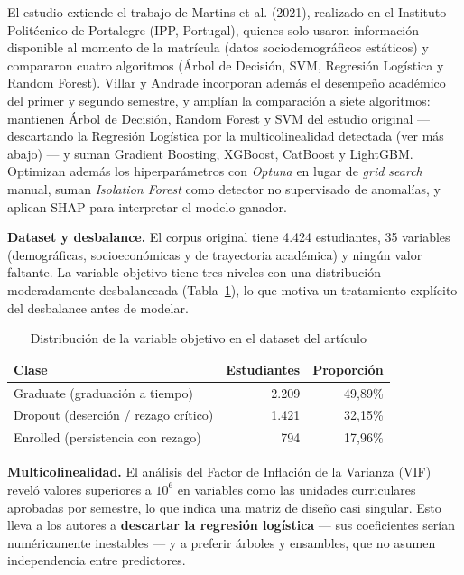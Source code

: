 \documentclass[11pt,a4paper]{article}
\begin{document}
El estudio extiende el trabajo de Martins et al. (2021), realizado en el Instituto Politécnico de Portalegre (IPP, Portugal), quienes solo usaron información disponible al momento de la matrícula (datos sociodemográficos estáticos) y compararon cuatro algoritmos (Árbol de Decisión, SVM, Regresión Logística y Random Forest). Villar y Andrade incorporan además el desempeño académico del primer y segundo semestre, y amplían la comparación a siete algoritmos: mantienen Árbol de Decisión, Random Forest y SVM del estudio original --- descartando la Regresión Logística por la multicolinealidad detectada (ver más abajo) --- y suman Gradient Boosting, XGBoost, CatBoost y LightGBM. Optimizan además los hiperparámetros con \textit{Optuna} en lugar de \textit{grid search} manual, suman \textit{Isolation Forest} como detector no supervisado de anomalías, y aplican SHAP para interpretar el modelo ganador.

\textbf{Dataset y desbalance.} El corpus original tiene 4.424 estudiantes, 35 variables (demográficas, socioeconómicas y de trayectoria académica) y ningún valor faltante. La variable objetivo tiene tres niveles con una distribución moderadamente desbalanceada (Tabla~\ref{tab:distribucion}), lo que motiva un tratamiento explícito del desbalance antes de modelar.

\begin{table}[h!]
\centering
\caption{Distribución de la variable objetivo en el dataset del artículo}
\label{tab:distribucion}
\begin{tabular}{lrr}
\toprule
Clase & Estudiantes & Proporción \\
\midrule
Graduate (graduación a tiempo) & 2.209 & 49{,}89\% \\
Dropout (deserción / rezago crítico) & 1.421 & 32{,}15\% \\
Enrolled (persistencia con rezago) & 794 & 17{,}96\% \\
\bottomrule
\end{tabular}
\end{table}

\textbf{Multicolinealidad.} El análisis del Factor de Inflación de la Varianza (VIF) reveló valores superiores a $10^{6}$ en variables como las unidades curriculares aprobadas por semestre, lo que indica una matriz de diseño casi singular. Esto lleva a los autores a \textbf{descartar la regresión logística} --- sus coeficientes serían numéricamente inestables --- y a preferir árboles y ensambles, que no asumen independencia entre predictores.
\end{document}
